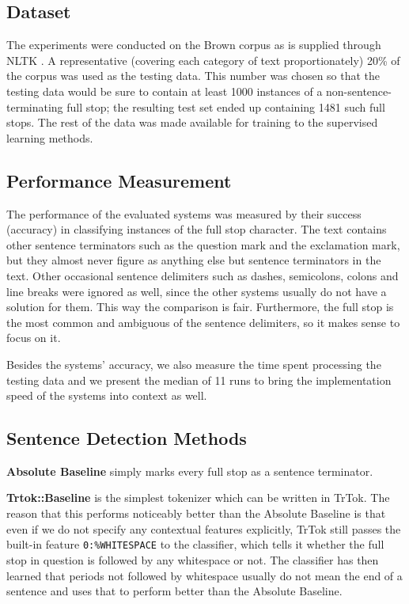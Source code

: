 \subsection{Dataset}

The experiments were conducted on the Brown corpus \cite{data-brown}
as is supplied through NLTK \cite{software-nltk}. A representative
(covering each category of text proportionately) 20\% of the corpus
was used as the testing data. This number was chosen so that the
testing data would be sure to contain at least 1000 instances of a
non-sentence-terminating full stop; the resulting test set ended up
containing 1481 such full stops. The rest of the data was made
available for training to the supervised learning methods.

\subsection{Performance Measurement}

The performance of the evaluated systems was measured by their success
(accuracy) in classifying instances of the full stop character. The
text contains other sentence terminators such as the question mark and
the exclamation mark, but they almost never figure as anything else
but sentence terminators in the text. Other occasional sentence
delimiters such as dashes, semicolons, colons and line breaks were
ignored as well, since the other systems usually do not have a
solution for them. This way the comparison is fair. Furthermore, the
full stop is the most common and ambiguous of the sentence delimiters,
so it makes sense to focus on it.

Besides the systems' accuracy, we also measure the time spent
processing the testing data and we present the median of 11 runs to
bring the implementation speed of the systems into context as well.

\subsection{Sentence Detection Methods}

\textbf{Absolute Baseline} simply marks every full stop as a sentence
terminator.

\textbf{Trtok::Baseline} is the simplest tokenizer which can be
written in TrTok. The reason that this performs noticeably better than
the Absolute Baseline is that even if we do not specify any contextual
features explicitly, TrTok still passes the built-in feature
\texttt{0:\%WHITESPACE} to the classifier, which tells it whether the
full stop in question is followed by any whitespace or not. The
classifier has then learned that periods not followed by whitespace
usually do not mean the end of a sentence and uses that to perform
better than the Absolute Baseline.


